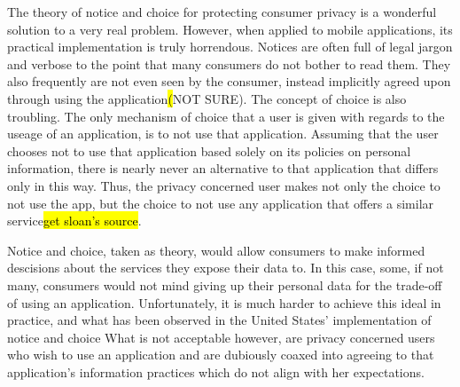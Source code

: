 The theory of notice and choice for protecting consumer privacy is a wonderful solution to a very real problem. However, when applied to mobile applications, its practical implementation is truly horrendous. Notices are often full of legal jargon and verbose to the point that many consumers do not bother to read them\cite{ftcworkshop}. They also frequently are not even seen by the consumer, instead implicitly agreed upon through using the application\hl(NOT SURE). The concept of choice is also troubling. The only mechanism of choice that a user is given with regards to the useage of an application, is to not use that application. Assuming that the user chooses not to use that application based solely on its policies on personal information, there is nearly never an alternative to that application that differs only in this way. Thus, the privacy concerned user makes not only the choice to not use the app, but the choice to not use any application that offers a similar service\hl{get sloan's source}. 



Notice and choice, taken as theory, would allow consumers to make informed descisions about the services they expose their data to. In this case, some, if not many, consumers would not mind giving up their personal data for the trade-off of using an application. 
Unfortunately, it is much harder to achieve this ideal in practice, and what has been observed in the United States' implementation of notice and choice 
What is not acceptable however, are privacy concerned users who wish to use an application and are dubiously coaxed into agreeing to that application's information practices which do not align with her expectations. 